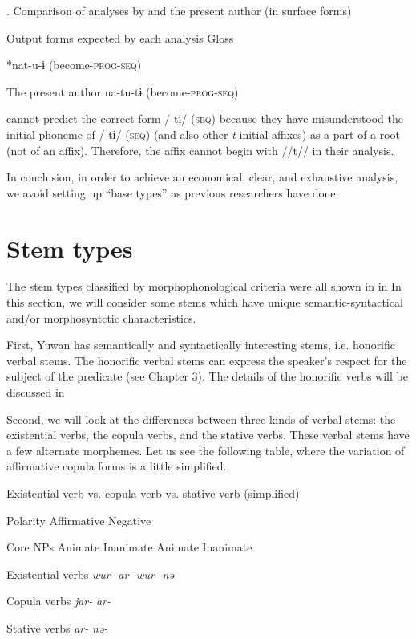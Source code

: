 \begin{table}
\caption{\label{tab:key:70}. Comparison of analyses by \citet{UchimaEtAl1976} and the present author (in surface forms)}

  Output forms expected by each analysis  Gloss

\citet{UchimaEtAl1976}  *nat-u-ɨ  (become-\textsc{prog}-\textsc{seq})

The present author  na-tu-tɨ  (become-\textsc{prog}-\textsc{seq})
\end{table}

\citet{UchimaEtAl1976} cannot predict the correct form /-tɨ/ (\textsc{seq}) because they have misunderstood the initial phoneme of /-tɨ/ (\textsc{seq}) (and also other \textit{t}-initial affixes) as a part of a root (not of an affix). Therefore, the affix cannot begin with //t// in their analysis.

  In conclusion, in order to achieve an economical, clear, and exhaustive analysis, we avoid setting up “base types” as previous researchers have done.

\section{Stem types}

The stem types classified by morphophonological criteria were all shown in  in  In this section, we will consider some stems which have unique semantic-syntactical and/or morphosyntctic characteristics.

  First, Yuwan has semantically and syntactically interesting stems, i.e. honorific verbal stems. The honorific verbal stems can express the speaker’s respect for the subject of the predicate (see Chapter 3). The details of the honorific verbs will be discussed in 

  Second, we will look at the differences between three kinds of verbal stems: the existential verbs, the copula verbs, and the stative verbs. These verbal stems have a few alternate morphemes. Let us see the following table, where the variation of affirmative copula forms is a little simplified.

\begin{table}
\caption{\label{tab:key:71}Existential verb vs. copula verb vs. stative verb (simplified)}

Polarity  Affirmative  Negative

Core NPs  Animate  Inanimate  Animate  Inanimate

Existential verbs  \textit{wur-}  \textit{ar-}  \textit{wur-}  \textit{nə-}

Copula verbs  \textit{jar-}  \textit{ar-}

Stative verbs  \textit{ar-}  \textit{nə-}
\end{table}

